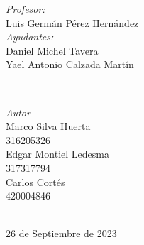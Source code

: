 \begin{titlepage}
    \vspace{10mm}
    \begin{minipage}{0.7\textwidth}
        \begin{flushleft} \large
            \emph{Profesor:}\\
                Luis Germán Pérez Hernández\\
                \vspace{3mm}
                \emph{Ayudantes:}\\
                Daniel Michel Tavera\\
                Yael Antonio Calzada Martín\\
        \end{flushleft}
    \end{minipage}
    \\
    \vspace{20mm}
    \begin{minipage}{0.4\textwidth}
        \begin{flushright} \large
        \centering
            \emph{Autor} \\ %
            \vspace{3mm}
            Marco Silva Huerta\\
            316205326\\
            \vspace{4mm}
            Edgar Montiel Ledesma\\
            317317794\\
            \vspace{4mm}
            Carlos Cortés\\
            420004846
        \end{flushright}
    \end{minipage}\\[2.6cm]
    \makeatother
    {\large 26 de Septiembre de 2023}\\[2cm]
    \vfill 
    \end{titlepage}